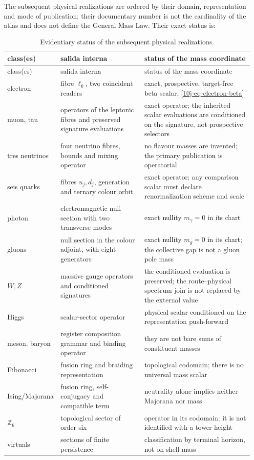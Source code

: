 The subsequent physical realizations are ordered by their domain, representation and mode of publication; their documentary number is not the cardinality of the atlas and does not define the General Mass Law. Their exact status is:
\begin{longtable}{@{}p{}p{}p{}@{}}
\caption{Evidentiary status of the subsequent physical realizations.}
\label{10j-tab-realizaciones-fisicas}\\
\toprule
class(es)&salida interna&status of the mass coordinate\\
\midrule
\endfirsthead
\toprule
class(es)&salida interna&status of the mass coordinate\\
\midrule
\endhead
electron&fibre \(\ell_0\), two coincident readers&exact, prospective, target-free beta scalar, \eqref{10j-eq-electron-beta}\\
muon, tau&operators of the leptonic fibres and preserved signature evaluations&exact operator; the inherited scalar evaluations are conditioned on the signature, not prospective selectors\\
tres neutrinos&four neutrino fibres, bounds and mixing operator&no flavour masses are invented; the primary publication is operatorial\\
seis quarks&fibres \(u_j,d_j\), generation and ternary colour orbit&exact operator; any comparison scalar must declare renormalization scheme and scale\\
photon&electromagnetic null section with two transverse modes&exact nullity \(m_\gamma=0\) in its chart\\
gluons&null section in the colour adjoint, with eight generators&exact nullity \(m_g=0\) in its chart; the collective gap is not a gluon pole mass\\
\(W,Z\)&massive gauge operators and conditioned signatures&the conditioned evaluation is preserved; the route--physical spectrum join is not replaced by the external value\\
Higgs&scalar-sector operator&physical scalar conditioned on the representation push-forward\\
meson, baryon&register composition grammar and binding operator&they are not bare sums of constituent masses\\
Fibonacci&fusion ring and braiding representation&topological codomain; there is no universal mass scalar\\
Ising/Majorana&fusion ring, self-conjugacy and compatible term&neutrality alone implies neither Majorana nor mass\\
\(\mathbb Z_6\)&topological sector of order six&operator in its codomain; it is not identified with a tower height\\
virtuals&sections of finite persistence&classification by terminal horizon, not on-shell mass\\
\bottomrule
\end{longtable}

